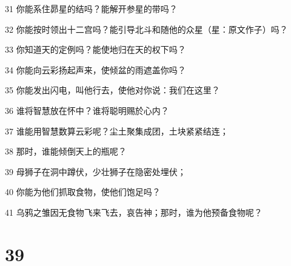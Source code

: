 \par 31 你能系住昴星的结吗？能解开参星的带吗？
\par 32 你能按时领出十二宫吗？能引导北斗和随他的众星（星：原文作子）吗？
\par 33 你知道天的定例吗？能使地归在天的权下吗？
\par 34 你能向云彩扬起声来，使倾盆的雨遮盖你吗？
\par 35 你能发出闪电，叫他行去，使他对你说：我们在这里？
\par 36 谁将智慧放在怀中？谁将聪明赐於心内？
\par 37 谁能用智慧数算云彩呢？尘土聚集成团，土块紧紧结连；
\par 38 那时，谁能倾倒天上的瓶呢？
\par 39 母狮子在洞中蹲伏，少壮狮子在隐密处埋伏；
\par 40 你能为他们抓取食物，使他们饱足吗？
\par 41 乌鸦之雏因无食物飞来飞去，哀告神；那时，谁为他预备食物呢？

\chapter{39}

